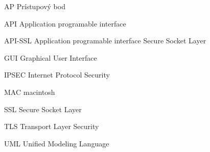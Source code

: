 \begin{seznamzkratek}{90}
	
		{AP}								%
		{Prístupový bod}	
	
		{API}								%
		{Application programable interface}
	
	
		{API-SSL}								%
		{Application programable interface Secure Socket Layer}	
	
		{GUI}								%
		{Graphical User Interface}	
	
		{IPSEC}								%
		{Internet Protocol Security}
	
		{MAC}								%
		{macintosh}	
	
		{SSL}								%
		{Secure Socket Layer}
	
		{TLS}								%
		{Transport Layer Security}	
	
		{UML}								%
		{Unified Modeling Language}

												
\end{seznamzkratek}
